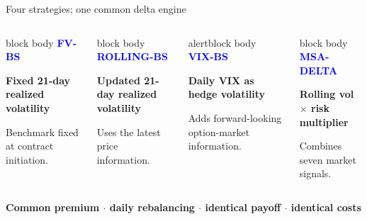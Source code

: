 \documentclass[aspectratio=169,10pt]{beamer}
\newcommand{\tagline}[1]{\textcolor{Blue}{\bfseries\scriptsize\MakeUppercase{#1}}}
\begin{document}
\begin{frame}{Four strategies; one common delta engine}
\small
\begin{columns}[T,onlytextwidth]
\begin{beamercolorbox}[rounded=true,sep=0.28cm]{block body}
\tagline{FV-BS}\par\vspace{0.15cm}
\textbf{Fixed 21-day realized volatility}\par\vspace{0.25cm}
Benchmark fixed at contract initiation.
\end{beamercolorbox}
\begin{beamercolorbox}[rounded=true,sep=0.28cm]{block body}
\tagline{Rolling-BS}\par\vspace{0.15cm}
\textbf{Updated 21-day realized volatility}\par\vspace{0.25cm}
Uses the latest price information.
\end{beamercolorbox}
\begin{beamercolorbox}[rounded=true,sep=0.28cm]{alertblock body}
\tagline{VIX-BS}\par\vspace{0.15cm}
\textbf{Daily VIX as hedge volatility}\par\vspace{0.25cm}
Adds forward-looking option-market information.
\end{beamercolorbox}
\begin{beamercolorbox}[rounded=true,sep=0.28cm]{block body}
\tagline{MSA-Delta}\par\vspace{0.15cm}
\textbf{Rolling vol $\times$ risk multiplier}\par\vspace{0.25cm}
Combines seven market signals.
\end{beamercolorbox}
\end{columns}
\vspace{0.55cm}
\centering
\colorbox{Sky}{\parbox{0.88\textwidth}{\centering\textbf{Common premium $\cdot$ daily rebalancing $\cdot$ identical payoff $\cdot$ identical costs}}}
\end{frame}
\end{document}
